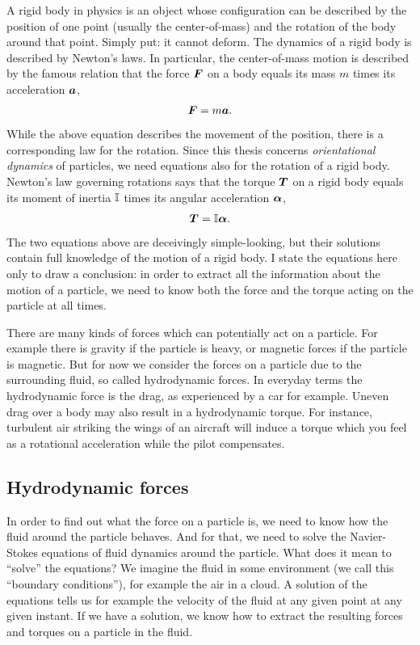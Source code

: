 \documentclass[thesis.tex]{subfiles}
\begin{document}
A rigid body in physics is an object whose configuration can be described by the position of one point (usually the center-of-mass) and the rotation of the body around that point. Simply put: it cannot deform. The dynamics of a rigid body is described by Newton's laws. In particular, the center-of-mass motion is described by the famous relation that the force $\mbox{\boldmath$F$}$ on a body equals its mass $m$ times its acceleration $\mbox{\boldmath$a$}$,
\begin{align*}
	\mbox{\boldmath$F$} = m\mbox{\boldmath$a$}.
\end{align*}
While the above equation describes the movement of the position, there is a corresponding law for the rotation. Since this thesis concerns \emph{orientational dynamics} of particles, we need equations also for the rotation of a rigid body. Newton's law governing rotations says that the torque $\mbox{\boldmath$T$}$ on a rigid body equals its moment of inertia $\mathbb{I}$ times its angular acceleration $\mbox{\boldmath$\alpha$}$,
\begin{align*}
	\mbox{\boldmath$T$} = \mathbb{I} \mbox{\boldmath$\alpha$}.
\end{align*}
The two equations above are deceivingly simple-looking, but their solutions contain full knowledge of the motion of a rigid body. I state the equations here only to draw a conclusion: in order to extract all the information about the motion of a particle, we need to know both the force and the torque acting on the particle at all times.

There are many kinds of forces which can potentially act on a particle. For example there is gravity if the particle is heavy, or magnetic forces if the particle is magnetic. But for now we consider the forces on a particle due to the surrounding fluid, so called hydrodynamic forces. In everyday terms the hydrodynamic force is the drag, as experienced by a car for example. Uneven drag over a body may also result in a hydrodynamic torque. For instance, turbulent air striking the wings of an aircraft will induce a torque which you feel as a rotational acceleration while the pilot compensates.

\subsection*{Hydrodynamic forces}

In order to find out what the force on a particle is, we need to know how the fluid around the particle behaves. And for that, we need to solve the Navier-Stokes equations of fluid dynamics around the particle. What does it mean to ``solve'' the equations? We imagine the fluid in some environment (we call this ``boundary conditions''), for example the air in a cloud. A solution of the equations tells us for example the velocity of the fluid at any given point at any given instant. If we have a solution, we know how to extract the resulting forces and torques on a particle in the fluid.
\end{document}
